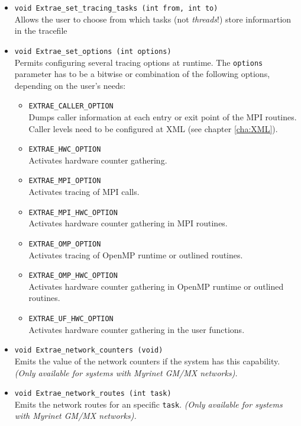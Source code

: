 \begin{itemize}
 \item {\tt void Extrae\_set\_tracing\_tasks (int from, int to)}\\
  Allows the user to choose from which tasks (not {\em threads}!) store informartion in the tracefile

 \item {\tt void Extrae\_set\_options (int options)}\\
  Permits configuring several tracing options at runtime. The {\tt options} parameter has to be a bitwise or combination of the following options, depending on the user's needs:
  \begin{itemize}
   \item {\tt EXTRAE\_CALLER\_OPTION}\\
    Dumps caller information at each entry or exit point of the MPI routines. Caller levels need to be configured at XML (see chapter \ref{cha:XML}).
   \item {\tt EXTRAE\_HWC\_OPTION}\\
    Activates hardware counter gathering.
   \item {\tt EXTRAE\_MPI\_OPTION}\\
    Activates tracing of MPI calls.
   \item {\tt EXTRAE\_MPI\_HWC\_OPTION}\\
    Activates hardware counter gathering in MPI routines.
   \item {\tt EXTRAE\_OMP\_OPTION}\\
    Activates tracing of OpenMP runtime or outlined routines.
   \item {\tt EXTRAE\_OMP\_HWC\_OPTION}\\
    Activates hardware counter gathering in OpenMP runtime or outlined routines.
   \item {\tt EXTRAE\_UF\_HWC\_OPTION}\\
    Activates hardware counter gathering in the user functions.
  \end{itemize}

 \item {\tt void Extrae\_network\_counters (void)}\\
  Emits the value of the network counters if the system has this capability. {\em (Only available for systems with Myrinet GM/MX networks).}

 \item {\tt void Extrae\_network\_routes (int task)}\\
  Emits the network routes for an specific {\tt task}. {\em (Only available for systems with Myrinet GM/MX networks).}

\end{itemize}


